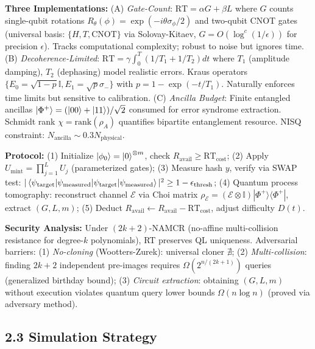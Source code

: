 \documentclass[a4paper,11pt,twoside]{article}
\begin{document}
\textbf{Three Implementations:} (A) \textit{Gate-Count}: $\text{RT} = \alpha G + \beta L$ where $G$ counts single-qubit rotations $R_\theta(\phi) = \exp(-i\theta\sigma_\phi/2)$ and two-qubit CNOT gates (universal basis: $\{H, T, \text{CNOT}\}$ via Solovay-Kitaev, $G = O(\log^c(1/\epsilon))$ for precision $\epsilon$). Tracks computational complexity; robust to noise but ignores time. (B) \textit{Decoherence-Limited}: $\text{RT} = \gamma \int_0^T (1/T_1 + 1/T_2) dt$ where $T_1$ (amplitude damping), $T_2$ (dephasing) model realistic errors. Kraus operators $\{E_0 = \sqrt{1-p}\mathbb{I}, E_1 = \sqrt{p}\sigma_-\}$ with $p = 1-\exp(-t/T_1)$. Naturally enforces time limits but sensitive to calibration. (C) \textit{Ancilla Budget}: Finite entangled ancillas $\ket{\Phi^+} = (\ket{00} + \ket{11})/\sqrt{2}$ consumed for error syndrome extraction. Schmidt rank $\chi = \text{rank}(\rho_A)$ quantifies bipartite entanglement resource. NISQ constraint: $N_{\text{ancilla}} \sim 0.3 N_{\text{physical}}$.

\textbf{Protocol:} (1) Initialize $\ket{\phi_0} = \ket{0}^{\otimes m}$, check $R_{\text{avail}} \geq \text{RT}_{\text{cost}}$; (2) Apply $U_{\text{mint}} = \prod_{j=1}^L U_j$ (parameterized gates); (3) Measure hash $y$, verify via SWAP test: $|\braket{\psi_{\text{target}}|\psi_{\text{measured}}}|^2 \geq 1-\epsilon_{\text{thresh}}$; (4) Quantum process tomography: reconstruct channel $\mathcal{E}$ via Choi matrix $\rho_{\mathcal{E}} = (\mathcal{E}\otimes\mathbb{I})|\Phi^+\rangle\langle\Phi^+|$, extract $(G,L,m)$; (5) Deduct $R_{\text{avail}} \leftarrow R_{\text{avail}} - \text{RT}_{\text{cost}}$, adjust difficulty $D(t)$.

\textbf{Security Analysis:} Under $(2k+2)$-NAMCR (no-affine multi-collision resistance for degree-$k$ polynomials), RT preserves QL uniqueness. Adversarial barriers: (1) \textit{No-cloning} (Wootters-Zurek): universal cloner $\nexists$; (2) \textit{Multi-collision}: finding $2k+2$ independent pre-images requires $\Omega(2^{n/(2k+1)})$ queries (generalized birthday bound); (3) \textit{Circuit extraction}: obtaining $(G,L,m)$ without execution violates quantum query lower bounds $\Omega(n\log n)$ (proved via adversary method).

\vspace{-4pt}
\subsection*{2.3 Simulation Strategy}
\vspace{-4pt}
\end{document}
